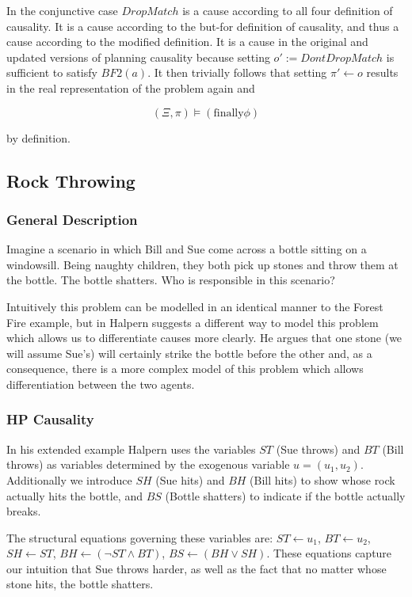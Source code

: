 \documentclass{article}
\theoremstyle{plain}
\theoremstyle{definition}
\begin{document}
In the conjunctive case $DropMatch$ is a cause according to all four definition of causality. It is a cause according to the but-for definition of causality, and thus a cause according to the modified definition. It is a cause in the original and updated versions of planning causality because setting $o':= DontDropMatch$ is sufficient to satisfy $BF2(a)$. It then trivially follows that setting $\pi' \leftarrow o$ results in the real representation of the problem again and

\[
(\Xi, \pi) \models (\textrm{finally} \phi)
\]

by definition.



\subsection{Rock Throwing} \label{sec:rockThrowing}
\subsubsection*{General Description}
Imagine a scenario in which Bill and Sue come across a bottle sitting on a windowsill. Being naughty children, they both pick up stones and throw them at the bottle. The bottle shatters. Who is responsible in this scenario?

Intuitively this problem can be modelled in an identical manner to the Forest Fire example, but in \cite{halpern2005causes} Halpern suggests a different way to model this problem which allows us to differentiate causes more clearly. He argues that one stone (we will assume Sue's) will certainly strike the bottle before the other and, as a consequence, there is a more complex model of this problem which allows differentiation between the two agents.



\subsubsection*{HP Causality}
In his extended example Halpern uses the variables $ST$ (Sue throws) and $BT$ (Bill throws) as variables determined by the exogenous variable $u=(u_1, u_2)$. Additionally we introduce $SH$ (Sue hits) and $BH$ (Bill hits) to show whose rock actually hits the bottle, and $BS$ (Bottle shatters) to indicate if the bottle actually breaks.

The structural equations governing these variables are: $ST\leftarrow u_1$, $BT\leftarrow u_2$, $SH \leftarrow ST$, $BH \leftarrow (\lnot ST \land BT)$, $BS \leftarrow (BH \lor SH)$. These equations capture our intuition that Sue throws harder, as well as the fact that no matter whose stone hits, the bottle shatters.
\end{document}
